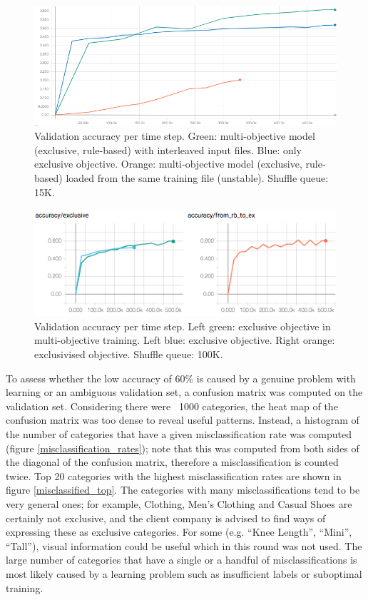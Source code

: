 \begin{figure}
  \includegraphics[width=\linewidth]{figures/multiobj/ex_vs_joint}
  \caption{Validation accuracy per time step. Green: multi-objective model (exclusive, rule-based) with interleaved input files. Blue: only exclusive objective. Orange: multi-objective model (exclusive, rule-based) loaded from the same training file (unstable). Shuffle queue: 15K.}
  \label{ex_vs_joint}
\end{figure}
\begin{figure}
  \includegraphics[width=\linewidth]{figures/multiobj/ex_vs_exclusivised}
  \caption{Validation accuracy per time step. Left green: exclusive objective in multi-objective training. Left blue: exclusive objective. Right orange: exclusivised objective. Shuffle queue: 100K.}
  \label{ex_vs_exclusivised}
\end{figure}

To assess whether the low accuracy of 60\% is caused by a genuine problem with learning or an ambiguous validation set, a confusion matrix was computed on the validation set.
Considering there were ~1000 categories, the heat map of the confusion matrix was too dense to reveal useful patterns.
Instead, a histogram of the number of categories that have a given misclassification rate was computed (figure \ref{misclassification_rates}); note that this was computed from both sides of the diagonal of the confusion matrix, therefore a misclassification is counted twice.
Top 20 categories with the highest misclassification rates are shown in figure \ref{misclassified_top}.
The categories with many misclassifications tend to be very general ones; for example, Clothing, Men's Clothing and Casual Shoes are certainly not exclusive, and the client company is advised to find ways of expressing these as exclusive categories.
For some (e.g. ``Knee Length'', ``Mini'', ``Tall''), visual information could be useful which in this round was not used.
The large number of categories that have a single or a handful of misclassifications is most likely caused by a learning problem such as insufficient labels or suboptimal training.


